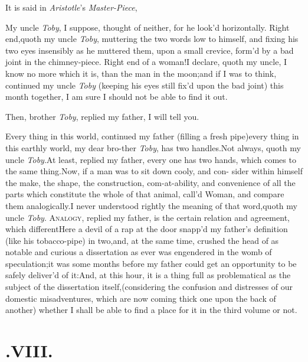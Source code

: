\documentclass{article}
\begin{document}
It is said in \textit{Aristotle}’s \textit{Master-Piece},\break
{}

My uncle \textit{Toby}, I suppose, thought of neither, for he
look’d horizontally.\tsk\break
Right end,\tsk quoth my uncle \textit{Toby}, muttering the two words low to himself, and fixing his
two eyes insensibly as he muttered them, upon a small crevice,
form’d by a bad joint in the chimney-piece.\tsk\break
Right end of a woman!\tsh I declare,
quoth my uncle, I know no more which it is, than the man in the
moon;\tsk and if I was to think, continued my uncle
\textit{Toby} (keeping his eyes still fix’d upon the bad joint)
this month together, I am sure I should not be able to find it
out.

Then, brother \textit{Toby}, replied my father, I will tell you.

Every thing in this world, continued my father (filling a fresh
pipe)\tsk every thing in this earthly world, my dear
bro-\break ther \textit{Toby},
has two handles.\tsk Not always, quoth my uncle
\textit{Toby}.\tsh At least, replied my father, every one
has two hands,\tsk\break
which comes to the same
thing.\tsh Now, if a man was to sit down cooly, and con-\break
sider within himself the make, the shape, the construction,
com-at-ability, and convenience of all the parts which
constitute
the whole of that animal, call’d Woman, and compare them
analogically.\tsk I never understood rightly the meaning of that
word,\tsk quoth my uncle \textit{Toby}.\tsh\break
\textsc{Analogy}, replied my father, is the certain
relation and agreement, which different\tsh Here a devil of
a rap at the door snapp’d my father’s definition (like his
tobacco-pipe) in two,\tsk and, at the same time, crushed the head
of as notable and curious a dissertation as ever was
engendered in the womb of speculation;\tsk it was some months
before my father could get an opportunity to be safely
deliver’d of
it:\tsk And, at this hour, it is a thing full as problematical as
the subject of the dissertation itself,\tsk (considering the
confusion and distresses of our domestic misadventures, which are
now coming thick one upon the back of another) whether I shall be
able to find a place for it in the third volume or not.

\section{.\enspace  VIII.}
\end{document}

